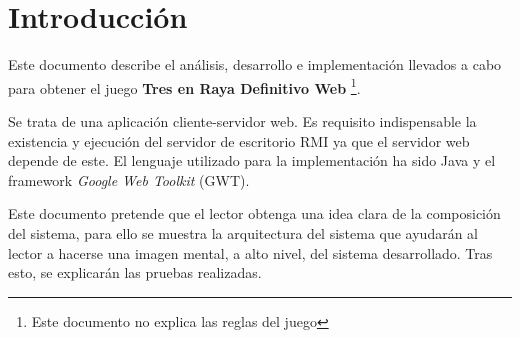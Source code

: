 \documentclass[a4paper,11pt,oneside]{article}
\begin{document}

\setcounter{page}{1}

\tableofcontents
\clearpage

\setcounter{page}{1}

\clearpage
\section{Introducción}

Este documento describe el análisis, desarrollo e implementación llevados a cabo para obtener
el juego \textbf{Tres en Raya Definitivo Web} \footnote{Este documento no explica las reglas del juego}.

Se trata de una aplicación cliente-servidor web. Es requisito indispensable la existencia y ejecución del servidor de escritorio RMI ya que el servidor web depende de este.
El lenguaje utilizado para la implementación ha sido Java y el framework \emph{Google Web Toolkit} (GWT).

Este documento pretende que el lector obtenga una idea clara de la composición del sistema, para ello se muestra la arquitectura del sistema que ayudarán al lector a hacerse una imagen mental, a alto nivel, del sistema desarrollado.
Tras esto, se explicarán las pruebas realizadas.

\clearpage



\clearpage


\clearpage
\end{document}
